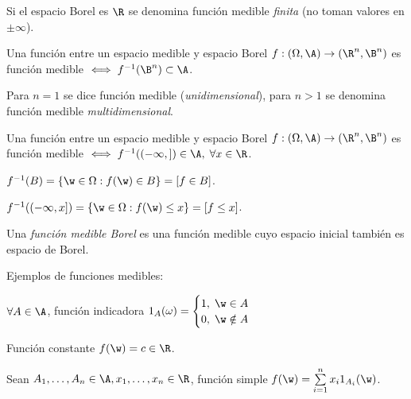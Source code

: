 \begin{nota}
  Si el espacio Borel es $\R$ se denomina función medible \emph{finita} (no toman valores en $\pm \infty$).
\end{nota}

\begin{nprop}
  Una función entre un espacio medible y espacio Borel $f : (\Omega, \A) \to (\R^n, \B^n)$ es función medible $\iff f^{-1}(\B^n) \subset \A$.
\end{nprop}

\begin{nota}
  Para $n = 1$ se dice función medible (\emph{unidimensional}), para $n>1$ se denomina función medible \emph{multidimensional}.
\end{nota}

\begin{nprop}
  Una función entre un espacio medible y espacio Borel $f : (\Omega, \A) \to (\R^n, \B^n)$ es función medible $\iff f^{-1}((-\infty, ]) \in \A, \; \forall x \in \R$.
\end{nprop}

\begin{nota}
  $f^{-1}(B) = \{ \w \in \Omega : f(\w) \in B \} = [f \in B]$.

  $f^{-1}((-\infty, x]) = \{ \w \in \Omega : f(\w) \leq x \} = [f \leq x]$.
\end{nota}

\begin{ndef}
  Una \emph{función medible Borel} es una función medible cuyo espacio inicial también es espacio de Borel.
\end{ndef}

Ejemplos de funciones medibles:

\begin{ejemplo}
  $\forall A \in \A$, función indicadora $1_A(\omega) =
    \begin{cases}
      1, \; \w \in A \\
      0, \; \w \notin A
    \end{cases}$
\end{ejemplo}

\begin{ejemplo}
  Función constante $f(\w) = c \in \R$.
\end{ejemplo}

\begin{ejemplo}
  Sean $A_1, \ldots, A_n \in \A, x_1, \ldots, x_n \in \R$, función simple $f(\w) = \sum \limits^n_{i = 1} x_i 1_{A_i}(\w)$.
\end{ejemplo}

